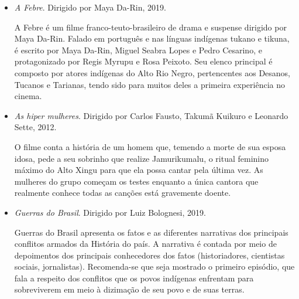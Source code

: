 \documentclass[11pt]{extarticle}
\begin{document}
\begin{itemize}
\item \textit{A Febre}. Dirigido por Maya Da-Rin, 2019.

A Febre é um filme franco-teuto-brasileiro de drama e suspense dirigido por Maya Da-Rin. Falado em português e nas línguas indígenas tukano e tikuna, é escrito por Maya Da-Rin, Miguel Seabra Lopes e Pedro Cesarino, e protagonizado por Regis Myrupu e Rosa Peixoto. Seu elenco principal é composto por atores indígenas do Alto Rio Negro, pertencentes aos Desanos, Tucanos e Tarianas, tendo sido para muitos deles a primeira experiência no cinema.

\item \textit{As hiper mulheres}. Dirigido por Carlos Fausto, Takumã Kuikuro e Leonardo Sette, 2012. 

O filme conta a história de um homem que, temendo a morte de sua esposa idosa, pede a seu sobrinho que realize Jamurikumalu, o ritual feminino máximo do Alto Xingu para que ela possa cantar pela última vez. As mulheres do grupo começam os testes enquanto a única cantora que realmente conhece todas as canções está gravemente doente.

\item \textit{Guerras do Brasil}. Dirigido por Luiz Bolognesi, 2019.

Guerras do Brasil apresenta os fatos e as diferentes narrativas dos principais conflitos armados da História do país. A narrativa é contada por meio de depoimentos dos principais conhecedores dos fatos (historiadores, cientistas sociais, jornalistas). Recomenda-se que seja mostrado o primeiro episódio, que fala a respeito dos conflitos que os povos indígenas enfrentam para sobreviverem em meio à dizimação de seu povo e de suas terras.

\end{itemize}
\end{document}
